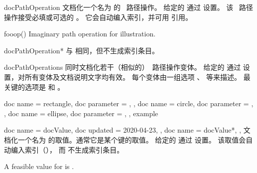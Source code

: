 \clearpage
\begin{docEnvironment}[doclang/environment content=operation description,
    doc new and updated={2019-09-18}{2020-04-22}]{docPathOperation}{}
  文档化一个名为  的 \tikzname\ 路径操作。
  给定的  通过  设置。
  该 \tikzname\ 路径操作接受必填或可选的 。
  它会自动编入索引，并可用
   引用。
\begin{dispExample}
\begin{docPathOperation}{fooop}{()}
  Imaginary path operation for illustration.
\end{docPathOperation}
\end{dispExample}
\end{docEnvironment}


\begin{docEnvironment}[doclang/environment content=command description,
    doc new and updated={2019-09-18}{2020-04-22}]{docPathOperation*}{}
  与  相同，但不生成索引条目。
\end{docEnvironment}


\begin{docEnvironment}[doclang/environment content=command description,
    doc new={2020-04-22}]{docPathOperations}{}
  同时文档化若干（相似的）\tikzname\ 路径操作变体。
  给定的  通过  设置，对所有变体及文档说明文字均有效。
  每个变体由一组选项 、 等来描述。
  最关键的选项是  和 。
\begin{dispExample}
\begin{docPathOperations}
  {
    {
      doc name      = rectangle,
      doc parameter = ,
    },
    {
      doc name      = circle,
      doc parameter = ,
    },
    {
      doc name      = ellipse,
      doc parameter = ,
    },
  }
  example
\end{docPathOperations}
\end{dispExample}
\end{docEnvironment}


\clearpage
\begin{docCommands}[doc parameter oarg marg={options}{name}]
  {
    {
      doc name    = docValue,
      doc updated = 2020-04-23,
    },
    {
      doc name = docValue*,
    },
  }
  文档化一个名为  的取值。通常它是某个键的取值。
  给定的  通过  设置。
  该取值会自动编入索引（），
  而  不生成索引条目。
\begin{dispExample}
A feasible value for  is .
\end{dispExample}
\end{docCommands}



